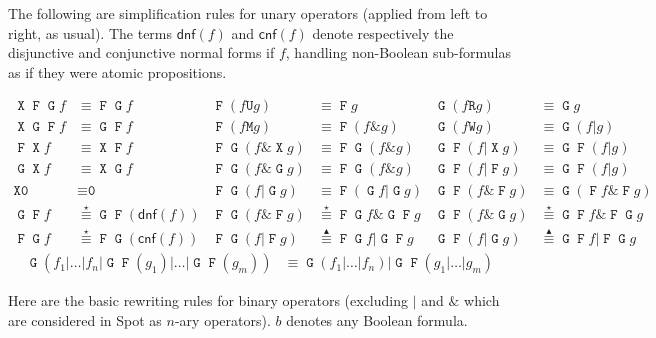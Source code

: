 \documentclass[a4paper,twoside,10pt,DIV=12]{scrreprt}
\DeclareMathOperator{\F}{\texttt{F}}
\DeclareMathOperator{\G}{\texttt{G}}
\newcommand{\U}{\mathbin{\texttt{U}}}
\newcommand{\R}{\mathbin{\texttt{R}}}
\DeclareMathOperator{\X}{\texttt{X}}
\newcommand{\M}{\mathbin{\texttt{M}}}
\newcommand{\W}{\mathbin{\texttt{W}}}
\newcommand{\OR}{\mathbin{\texttt{|}}}
\newcommand{\AND}{\mathbin{\texttt{\&}}}
\newcommand{\0}{\texttt{0}}
\newcommand{\1}{\texttt{1}}
\newcommand{\equiV}{\stackrel{\star}{\equiv}}
\newcommand{\equivEU}{\stackrel{\blacktriangleup}{\equiv}}
\begin{document}
The following are simplification rules for unary operators (applied
from left to right, as usual).  The terms $\mathsf{dnf}(f)$ and
$\mathsf{cnf}(f)$ denote respectively the disjunctive and conjunctive
normal forms if $f$, handling non-Boolean sub-formulas as if they were
atomic propositions.

\begin{align*}
\X\F\G f & \equiv \F\G f                & \F(f\U g)        & \equiv \F g              & \G(f \R g)      & \equiv \G g             \\
\X\G\F f & \equiv \G\F f                & \F(f\M g)        & \equiv \F (f\AND g)      & \G(f \W g)      & \equiv \G(f\OR g)       \\
\F\X f   & \equiv \X\F f                & \F\G(f\AND \X g) & \equiv \F\G(f\AND g)     & \G\F(f\OR \X g) & \equiv \G\F(f\OR g)     \\
\G\X f   & \equiv \X\G f                & \F\G(f\AND \G g) & \equiv \F\G(f\AND g)     & \G\F(f\OR \F g) & \equiv \G\F(f\OR g)     \\
\X\0     & \equiv \0                    & \F\G(f\OR\G g)   & \equiv \F(\G f\OR\G g)   & \G\F(f\AND\F g) & \equiv \G(\F f\AND\F g) \\
\G\F f   & \equiV \G\F(\mathsf{dnf}(f)) & \F\G(f\AND\F g)  & \equiV \F\G f\AND\G\F g  & \G\F(f\AND\G g) & \equiV \G\F f\AND\F\G g \\
\F\G f   & \equiV \F\G(\mathsf{cnf}(f)) & \F\G(f\OR\F g)   & \equivEU \F\G f\OR\G\F g & \G\F(f\OR\G g)  & \equivEU \G\F f\OR\F\G g
\end{align*}
\begin{align*}
  \G(f_1\OR\ldots\OR f_n \OR \G\F(g_1)\OR\ldots\OR \G\F(g_m)) & \equiv \G(f_1\OR\ldots\OR f_n)\OR \G\F(g_1\OR\ldots\OR g_m)
\end{align*}


Here are the basic rewriting rules for binary operators (excluding
$\OR$ and $\AND$ which are considered in Spot as $n$-ary operators).
$b$ denotes any Boolean formula.
\end{document}
